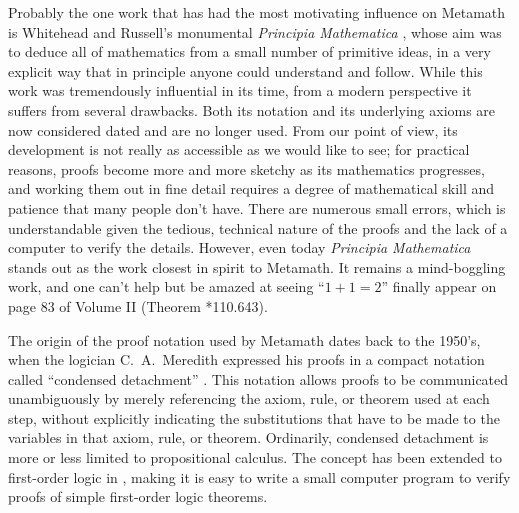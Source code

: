 Probably the one work that has had the most motivating influence on
Metamath is Whitehead and Russell's monumental {\em Principia
Mathematica} \cite{PM}, whose aim
was to deduce all of mathematics from a small number of primitive ideas, in a
very explicit way that in principle anyone could understand and follow.  While
this work was tremendously influential in its time, from a modern perspective
it suffers from several drawbacks.  Both its notation and its underlying
axioms are now considered dated and are no longer used.  From our point of
view, its development is not really as accessible as we would like to see; for
practical reasons, proofs become more and more sketchy as its mathematics
progresses, and working them out in fine detail requires a degree of
mathematical skill and patience that many people don't have.  There are
numerous small errors, which is understandable given the tedious, technical
nature of the proofs and the lack of a computer to verify the details.
However, even today {\em Principia Mathematica} stands out as the work closest
in spirit to Metamath.  It remains a mind-boggling work, and one can't help
but be amazed at seeing ``$1+1=2$'' finally appear on page 83 of Volume II
(Theorem *110.643).

The origin of the proof notation used by Metamath dates back to the 1950's,
when the logician C.~A.~Meredith expressed his proofs in a compact notation
called ``condensed detachment''
\cite{Hindley} \cite{Kalman}
\cite{Meredith} \cite{Peterson}.  This notation allows proofs to be communicated unambiguously by
merely referencing the axiom, rule, or
theorem used at each step, without explicitly indicating the
substitutions that
have to be made to the variables in that axiom, rule, or theorem.  Ordinarily,
condensed detachment is more or less limited to propositional
calculus.  The concept has been extended to
first-order logic in \cite{Megill}, making it is easy to write a small computer program to verify proofs
of simple first-order logic theorems.

